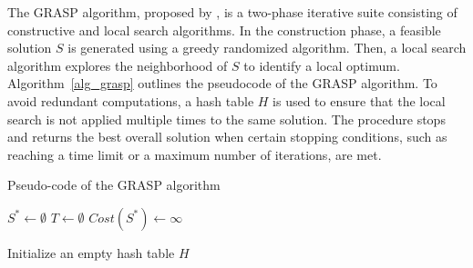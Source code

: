 \documentclass{article}
\begin{document}
The GRASP algorithm, proposed by \cite{feo1989probabilistic}, is a two-phase iterative suite consisting of constructive and local search algorithms. In the construction phase, a feasible solution $S$ is generated using a greedy randomized algorithm. Then, a local search algorithm explores the neighborhood of $S$ to identify a local optimum. Algorithm~\ref{alg_grasp} outlines the pseudocode of the GRASP algorithm. To avoid redundant computations, a hash table $H$ is used to ensure that the local search is not applied multiple times to the same solution.  The procedure stops and returns the best overall solution when certain stopping conditions, such as reaching a time limit or a maximum number of iterations, are met. %

    {
        {\small
            \begin{algorithm}[hbpt]
                \caption{Pseudo-code of the GRASP algorithm }
                \label{alg_grasp}
                \DontPrintSemicolon
                \LinesNumbered
                \setcounter{AlgoLine}{0}
                $S^* \leftarrow \emptyset$    \hspace{2mm} $T \leftarrow \emptyset$       $Cost(S^*) \leftarrow \infty$

                Initialize an empty hash table $H$



            \end{algorithm}}
    }
\end{document}
